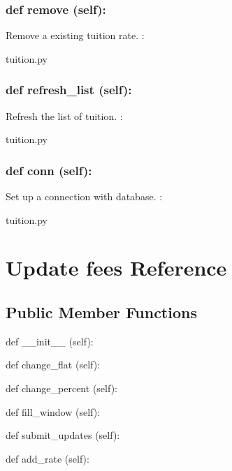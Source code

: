 \hypertarget{class_poly_a14a7ad77ce612b0c54f531d307ee4b39}{
\subsubsection[{def remove (self):}]{\setlength{\rightskip}{0pt plus 5cm}def {remove} (self):}}\label{class_poly_a14a7ad77ce612b0c54f531d307ee4b39}
Remove a existing tuition rate.
:\begin{DoxyCompactItemize}
\item 
tuition.\-py\end{DoxyCompactItemize}

\hypertarget{class_poly_a14a7ad77ce612b0c54f531d307ee4b39}{
\subsubsection[{def refresh_list (self):}]{\setlength{\rightskip}{0pt plus 5cm}def {refresh\_list} (self):}}\label{class_poly_a14a7ad77ce612b0c54f531d307ee4b39}
Refresh the list of tuition.
:\begin{DoxyCompactItemize}
\item 
tuition.\-py\end{DoxyCompactItemize}

\hypertarget{class_poly_a14a7ad77ce612b0c54f531d307ee4b39}{
\subsubsection[{def conn (self):}]{\setlength{\rightskip}{0pt plus 5cm}def {conn} (self):}}\label{class_poly_a14a7ad77ce612b0c54f531d307ee4b39}
Set up a connection with database.
:\begin{DoxyCompactItemize}
\item 
tuition.\-py\end{DoxyCompactItemize}


\hypertarget{Update_fees}{\section{Update fees Reference}
\label{Update_fees}
}
\subsection*{Public Member Functions}
\begin{DoxyCompactItemize}
\item 
def {\_\_init\_\_} (self):
\item 
def {change\_flat} (self):
\item 
def {change\_percent} (self):
\item 
def {fill\_window} (self):
\item 
def {submit\_updates} (self):
\item 
def {add\_rate} (self):
\end{DoxyCompactItemize}

